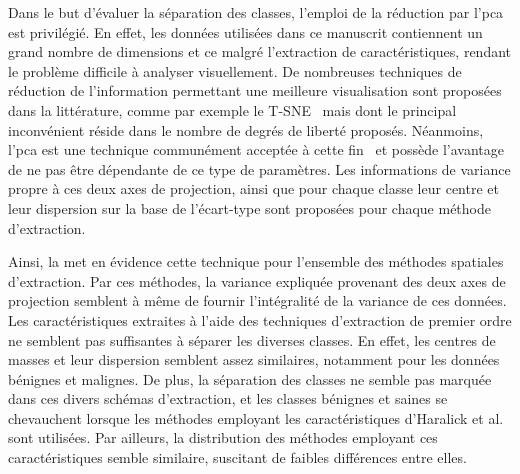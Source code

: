 Dans le but d'évaluer la séparation des classes, l'emploi de la réduction par l'\gls{pca} est privilégié. En effet, les données utilisées dans ce manuscrit contiennent un grand nombre de dimensions et ce malgré l'extraction de caractéristiques, rendant le problème difficile à analyser visuellement. De nombreuses techniques de réduction de l'information permettant une meilleure visualisation sont proposées dans la littérature, comme par exemple le T-SNE~\cite{Maaten2008} mais dont le principal inconvénient réside dans le nombre de degrés de liberté proposés. Néanmoins, l'\gls{pca} est une technique communément acceptée à cette fin~\cite{Himberg2001} et possède l'avantage de ne pas être dépendante de ce type de paramètres. Les informations de variance propre à ces deux axes de projection, ainsi que pour chaque classe leur centre et leur dispersion sur la base de l'écart-type sont proposées pour chaque méthode d'extraction.\par

Ainsi, la  met en évidence cette technique pour l'ensemble des méthodes spatiales d'extraction. Par ces méthodes, la variance expliquée provenant des deux axes de projection semblent à même de fournir l'intégralité de la variance de ces données. Les caractéristiques extraites à l'aide des techniques d'extraction de premier ordre ne semblent pas suffisantes à séparer les diverses classes. En effet, les centres de masses et leur dispersion semblent assez similaires, notamment pour les données bénignes et malignes. De plus, la séparation des classes ne semble pas marquée dans ces divers schémas d'extraction, et les classes bénignes et saines se chevauchent lorsque les méthodes employant les caractéristiques d'Haralick et al. sont utilisées. Par ailleurs, la distribution des méthodes employant ces caractéristiques semble similaire, suscitant de faibles différences entre elles.\par

